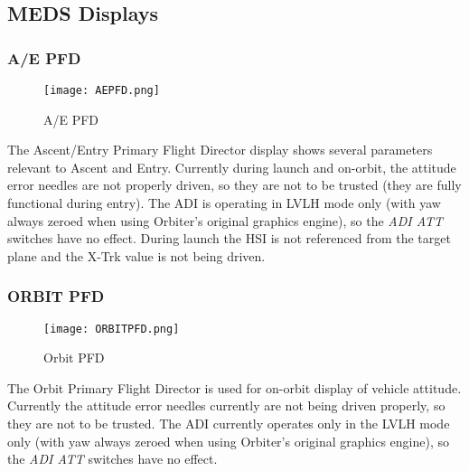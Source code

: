 \documentclass[Space_Shuttle_Vessel_Manual.tex]{subfiles}
\begin{document}
\subsection{MEDS Displays}
\begin{multicols*}{2}
\label{sec:meds-displays}

\subsubsection{A/E PFD}
\begin{figure}[H]
  \texttt{[image: AEPFD.png]}
  \caption{A/E PFD}
  \label{fig:AE_PFD}
\end{figure}
The Ascent/Entry Primary Flight Director display shows several parameters relevant to Ascent and Entry. Currently during launch and on-orbit, the attitude error needles are not properly driven, so they are not to be trusted (they are fully functional during entry). The ADI is operating in LVLH mode only (with yaw always zeroed when using Orbiter's original graphics engine), so the \textit{ADI ATT} switches have no effect. During launch the HSI is not referenced from the target plane and the X-Trk value is not being driven.

\subsubsection{ORBIT PFD}
\begin{figure}[H]
  \texttt{[image: ORBITPFD.png]}
  \caption{Orbit PFD}
  \label{fig:Orbit_PFD}
\end{figure}
The Orbit Primary Flight Director is used for on-orbit display of vehicle attitude. Currently the attitude error needles currently are not being driven properly, so they are not to be trusted. The ADI currently operates only in the LVLH mode only (with yaw always zeroed when using Orbiter's original graphics engine), so the \textit{ADI ATT} switches have no effect.
\end{multicols*}
\end{document}
